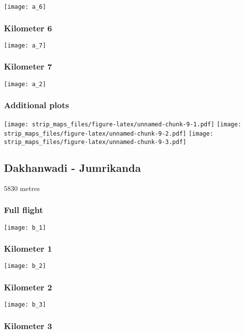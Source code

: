 \documentclass[]{article}
\begin{document}
\texttt{[image: a\_6]}

\subsubsection{Kilometer 6}\label{kilometer-6}

\texttt{[image: a\_7]}

\subsubsection{Kilometer 7}\label{kilometer-7}

\texttt{[image: a\_2]}

\subsubsection{Additional plots}\label{additional-plots}

\texttt{[image: strip\_maps\_files/figure-latex/unnamed-chunk-9-1.pdf]}
\texttt{[image: strip\_maps\_files/figure-latex/unnamed-chunk-9-2.pdf]}
\texttt{[image: strip\_maps\_files/figure-latex/unnamed-chunk-9-3.pdf]}

\newpage

\subsection{Dakhanwadi - Jumrikanda}\label{dakhanwadi---jumrikanda}

5830 metres

\subsubsection{Full flight}\label{full-flight-1}

\texttt{[image: b\_1]}

\subsubsection{Kilometer 1}\label{kilometer-1-1}

\texttt{[image: b\_2]}

\subsubsection{Kilometer 2}\label{kilometer-2-1}

\texttt{[image: b\_3]}

\subsubsection{Kilometer 3}\label{kilometer-3-1}
\end{document}
